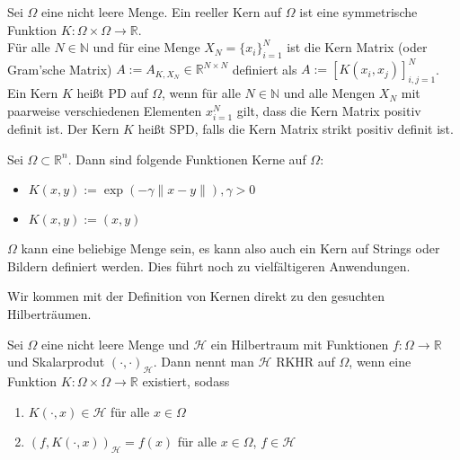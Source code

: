 \begin{definition}
\label{Kern}
Sei $\Omega$ eine nicht leere Menge. Ein reeller Kern auf $\Omega$ ist eine symmetrische Funktion $K: \Omega \times \Omega \rightarrow \mathbb{R}$.\\
Für alle $N \in \mathbb{N}$ und für eine Menge $X_N = \{x_i\}_{i=1}^N$ ist die Kern Matrix (oder Gram'sche Matrix) $A:= A_{K,X_N} \in \mathbb{R}^{N \times N}$  definiert als $A:=[K(x_i, x_j)]_{i,j=1}^N$.\\
Ein Kern $K$ heißt \ac{PD} auf $\Omega$, wenn für alle $N \in \mathbb{N}$ und alle Mengen $X_N$ mit paarweise verschiedenen Elementen $x_{i=1}^N$ gilt, dass die Kern Matrix positiv definit ist. Der Kern $K$ heißt \ac{SPD}, falls die Kern Matrix strikt positiv definit ist.
\end{definition}

\begin{example} Sei $\Omega \subset \mathbb{R}^n$. Dann sind folgende Funktionen Kerne auf $\Omega$:\\
\begin{itemize}
\item $K(x,y) := \exp(-\gamma \|x-y\|),\gamma > 0$
\item $K(x,y) := (x,y)$
\end{itemize}
\end{example}

\begin{remark}
$\Omega$ kann eine beliebige Menge sein, es kann also auch ein Kern auf Strings oder Bildern definiert werden. Dies führt noch zu vielfältigeren Anwendungen.
\end{remark}

Wir kommen mit der Definition von Kernen direkt zu den gesuchten Hilberträumen.

\begin{definition}
Sei $\Omega$ eine nicht leere Menge und $\mathcal{H}$ ein Hilbertraum mit Funktionen $f:\Omega \rightarrow \mathbb{R}$ und Skalarprodut $(\cdot, \cdot)_\mathcal{H}$. Dann nennt man $\mathcal{H}$ \ac{RKHR} auf $\Omega$, wenn eine Funktion $K:\Omega \times \Omega \rightarrow \mathbb{R}$ existiert, sodass
\begin{enumerate}
\item $K(\cdot, x) \in \mathcal{H}$ für alle $x \in \Omega$
\item $(f, K(\cdot,x))_\mathcal{H} = f(x)$ für alle $ x \in \Omega$, $f \in \mathcal{H}$
\end{enumerate}
\end{definition}

